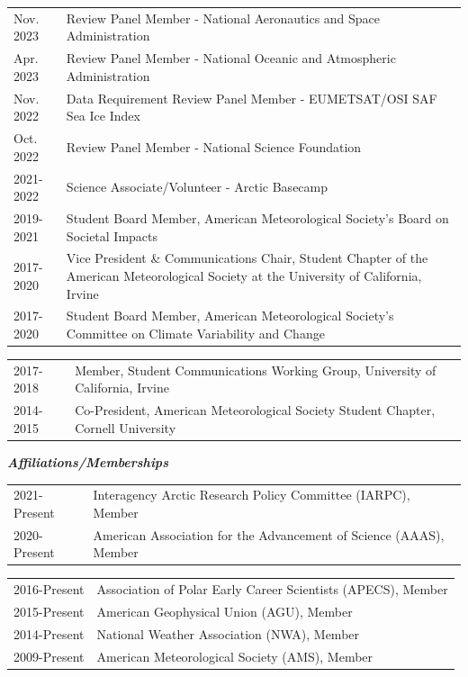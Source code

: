 \documentclass[margin,line,palatino,courier,10pt]{res}
\begin{document}
\begin{resume}
\begin{tabular}{@{}p{0.9in}p{4in}}
Nov. 2023 & Review Panel Member - National Aeronautics and Space Administration\\
Apr. 2023 & Review Panel Member - National Oceanic and Atmospheric Administration\\
Nov. 2022 & Data Requirement Review Panel Member -  EUMETSAT/OSI SAF Sea Ice Index\\ 
Oct. 2022 & Review Panel Member - National Science Foundation\\
2021-2022 & Science Associate/Volunteer - Arctic Basecamp\\
2019-2021& Student Board Member, American Meteorological Society's Board on Societal Impacts\\
2017-2020 & Vice President \& Communications Chair, Student Chapter of the American Meteorological Society at the University of California, Irvine\\
2017-2020 & Student Board Member, American Meteorological Society's Committee on Climate Variability and Change\\
\end{tabular}
\begin{tabular}{@{}p{0.9in}p{4in}}
2017-2018 & Member, Student Communications Working Group, University of California, Irvine\\
2014-2015 & Co-President, American Meteorological Society Student Chapter, Cornell University\\
\end{tabular}

\textit{\textbf{Affiliations/Memberships}}
\vspace*{0.05in}\\
\begin{tabular}{@{}p{0.9in}p{4in}}
2021-Present & Interagency Arctic Research Policy Committee (IARPC), Member\\
2020-Present & American Association for the Advancement of Science (AAAS), Member\\
\end{tabular}
\begin{tabular}{@{}p{0.9in}p{4in}}
2016-Present & Association of Polar Early Career Scientists (APECS), Member\\ 
2015-Present & American Geophysical Union (AGU), Member\\
2014-Present & National Weather Association (NWA), Member\\
2009-Present & American Meteorological Society (AMS), Member\\
\end{tabular}


\end{resume}
\end{document}

